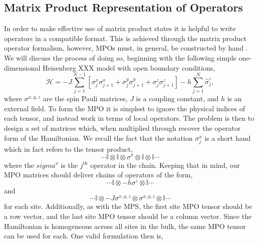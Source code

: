  \subsection{Matrix Product Representation of Operators}
 In order to make effective use of matrix product states it is helpful to write operators in a compatible format. This is achieved through the matrix product operator formalism, however, MPOs must, in general, be constructed by hand \cite{McCulloch07,CB08,FND10,PMCV10,Schollwoeck11}. We will discuss the process of doing so, beginning with the following simple one-dimensional Heisenberg XXX model with open boundary conditions,
 \begin{equation}
 	\mathcal {H} = -J \sum_{j=1}^{N-1} \left[ \sigma^{x}_{j}\sigma^{x}_{j+1} + \sigma^{y}_{j}\sigma^{y}_{j+1} + \sigma^{z}_{j}\sigma^{z}_{j+1} \right] - h \sum_{j=1}^{N} \hat{\sigma}^{z}_{j},  
 	\label{eq:mpo1-1}
 \end{equation}
 where \(\sigma^{x,y,z}\) are the spin Pauli matrices, \(J\) is a coupling constant, and \(h\) is an external field. To form the MPO it is simplest to ignore the physical indices of each tensor, and instead work in terms of local operators. The problem is then to design a set of matrices which, when multiplied through recover the operator form of the Hamiltonian. We recall the fact that the notation \(\sigma^{x}_{j}\) is a short hand which in fact refers to the tensor product,
 \begin{equation*}
 	\cdots \mathbb{I} \otimes \mathbb{I} \otimes \sigma^{x} \otimes \mathbb{I} \otimes \mathbb{I} \cdots
 \end{equation*}
 where the \(sigma^{x}\) is the \(j^{\mathrm{th}}\) operator in the chain. Keeping that in mind, our MPO matrices should deliver chains of operators of the form,
 \begin{equation*}
 	\cdots \mathbb{I} \otimes -h\sigma^{z} \otimes \mathbb{I} \cdots
 \end{equation*}
 and
 \begin{equation*}
 	\cdots \mathbb{I} \otimes -J\sigma^{x,y,z} \otimes \sigma^{x,y,z} \otimes \mathbb{I} \cdots
 \end{equation*}
 for each site. Additionally, as with the MPS, the first site MPO tensor should be a row vector, and the last site MPO tensor should be a column vector. Since the Hamiltonian is homogeneous across all sites in the bulk, the same MPO tensor can be used for each. One valid formulation then is,
